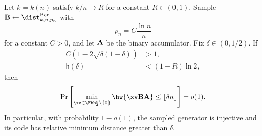 \begin{theorem}
\label{thm:ea-linear-distance}
Let $k=k(n)$ satisfy $k/n\to R$ for a constant $R\in(0,1)$.  Sample
$\B\gets\dist^{\mathrm{Ber}}_{k,n,p_n}$ with
\begin{equation}
 p_n=C\frac{\ln n}{n}
 \label{eq:ea-density}
\end{equation}
for a constant $C>0$, and let $\mathbf A$ be the binary accumulator.  Fix
$\delta\in(0,1/2)$.  If
\begin{align}
 C\left(1-2\sqrt{\delta(1-\delta)}\right)&>1,
 \label{eq:ea-sparse-condition}\\
 \mathsf{h}(\delta)&<(1-R)\ln 2,
 \label{eq:ea-gv-condition}
\end{align}
then
\begin{equation}
 \Pr\left[
   \min_{\xv\in\Fbb_2^k\setminus\{0\}}
   \hw{\xv\B\A}\leq\lfloor\delta n\rfloor
 \right]=o(1).
 \label{eq:ea-linear-distance-conclusion}
\end{equation}
In particular, with probability $1-o(1)$, the sampled generator is injective
and its code has relative minimum distance greater than $\delta$.
\end{theorem}

